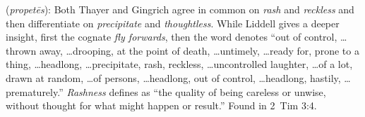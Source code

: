 \item[Rashness,]

(\textit{propetēs}):
Both Thayer and Gingrich agree in common on \emph{rash} and \emph{reckless} and then differentiate on \emph{precipitate} and \emph{thoughtless}. While Liddell gives a deeper insight, first the cognate  \emph{fly forwards}, then the word denotes ``out of control, \ldots thrown away, \ldots drooping, at the point of death, \ldots untimely, \ldots ready for, prone to a thing, \ldots headlong, \ldots precipitate, rash, reckless, \ldots uncontrolled laughter, \ldots of a lot, drawn at random, \ldots of persons, \ldots headlong, out of control, \ldots headlong, hastily, \ldots prematurely.'' \emph{Rashness} defines as ``the quality of being careless or unwise, without thought for what might happen or result.''
Found in 2~Tim 3:4.
